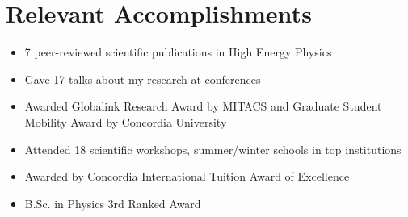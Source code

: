 \documentclass[]{friggeri-cv}
\begin{document}
\section{Relevant  Accomplishments}

\begin{itemize}[topsep=0pt, partopsep=0pt]
		\item 7 peer-reviewed scientific publications in High Energy Physics 
		\item Gave 17 talks about my research at conferences
	    \item Awarded Globalink Research Award by MITACS and Graduate Student Mobility Award by Concordia University
		\item Attended 18 scientific workshops, summer/winter schools in top institutions	   
		\item Awarded by Concordia International Tuition Award of Excellence
	    \item B.Sc. in Physics 3rd Ranked Award		 
\end{itemize}
\end{document}
